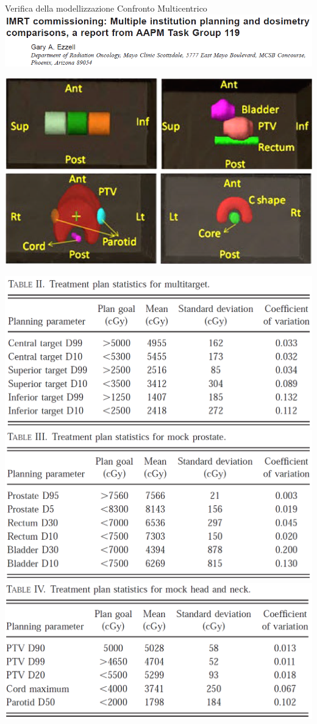 \documentclass{beamer}
\begin{document}
\begin{frame}[t]{Verifica della modellizzazione}
\footnotesize
\alert{Confronto Multicentrico}\\ \vspace{.2cm}
\includegraphics[width=.8\textwidth]{./img/TG119.png}
\begin{center}
\includegraphics[width=.7\textwidth]{../cap2/TG119_Phantoms.png}\\
\end{center}
\includegraphics[width=.33\textwidth]{./img/TG119_tab1.png}
\includegraphics[width=.33\textwidth]{./img/TG119_tab2.png}
\includegraphics[width=.33\textwidth]{./img/TG119_tab3.png}
\end{frame}
\end{document}
